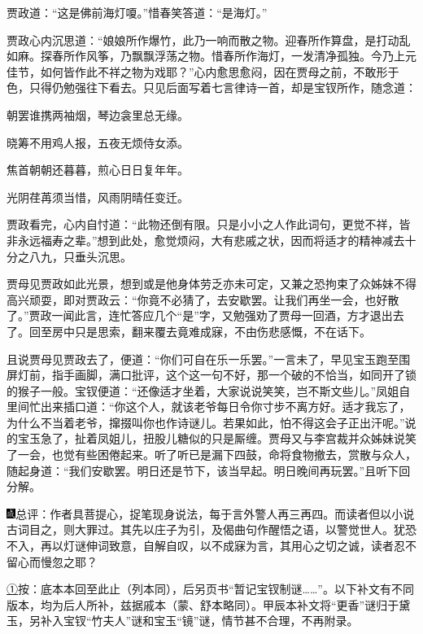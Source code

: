 贾政道：``这是佛前海灯嗄。''惜春笑答道：``是海灯。''

贾政心内沉思道：``娘娘所作爆竹，此乃一响而散之物。迎春所作算盘，是打动乱如麻。探春所作风筝，乃飘飘浮荡之物。惜春所作海灯，一发清净孤独。今乃上元佳节，如何皆作此不祥之物为戏耶？''心内愈思愈闷，因在贾母之前，不敢形于色，只得仍勉强往下看去。只见后面写着七言律诗一首，却是宝钗所作，随念道：

朝罢谁携两袖烟，琴边衾里总无缘。

晓筹不用鸡人报，五夜无烦侍女添。

焦首朝朝还暮暮，煎心日日复年年。

光阴荏苒须当惜，风雨阴晴任变迁。

贾政看完，心内自忖道：``此物还倒有限。只是小小之人作此词句，更觉不祥，皆非永远福寿之辈。''想到此处，愈觉烦闷，大有悲戚之状，因而将适才的精神减去十分之八九，只垂头沉思。

贾母见贾政如此光景，想到或是他身体劳乏亦未可定，又兼之恐拘束了众姊妹不得高兴顽耍，即对贾政云：``你竟不必猜了，去安歇罢。让我们再坐一会，也好散了。''贾政一闻此言，连忙答应几个``是''字，又勉强劝了贾母一回酒，方才退出去了。回至房中只是思索，翻来覆去竟难成寐，不由伤悲感慨，不在话下。

且说贾母见贾政去了，便道：``你们可自在乐一乐罢。''一言未了，早见宝玉跑至围屏灯前，指手画脚，满口批评，这个这一句不好，那一个破的不恰当，如同开了锁的猴子一般。宝钗便道：``还像适才坐着，大家说说笑笑，岂不斯文些儿。''凤姐自里间忙出来插口道：``你这个人，就该老爷每日令你寸步不离方好。适才我忘了，为什么不当着老爷，撺掇叫你也作诗谜儿。若果如此，怕不得这会子正出汗呢。''说的宝玉急了，扯着凤姐儿，扭股儿糖似的只是厮缠。贾母又与李宫裁并众姊妹说笑了一会，也觉有些困倦起来。听了听已是漏下四鼓，命将食物撤去，赏散与众人，随起身道：``我们安歇罢。明日还是节下，该当早起。明日晚间再玩罢。''且听下回分解。

{\includegraphics[width=3mm]{../Images/00005}总评：作者具菩提心，捉笔现身说法，每于言外警人再三再四。而读者但以小说古词目之，则大罪过。其先以庄子为引，及偈曲句作醒悟之语，以警觉世人。犹恐不入，再以灯谜伸词致意，自解自叹，以不成寐为言，其用心之切之诚，读者忍不留心而慢忽之耶？}

{\href{../Text/part0026_split_000.html\#navto_1_a}{①}按：底本本回至此止（列本同），后另页书``暂记宝钗制谜\ldots{}\ldots{}''。以下补文有不同版本，均为后人所补，兹据戚本（蒙、舒本略同）。甲辰本补文将``更香''谜归于黛玉，另补入宝钗``竹夫人''谜和宝玉``镜''谜，情节甚不合理，不再附录。}
